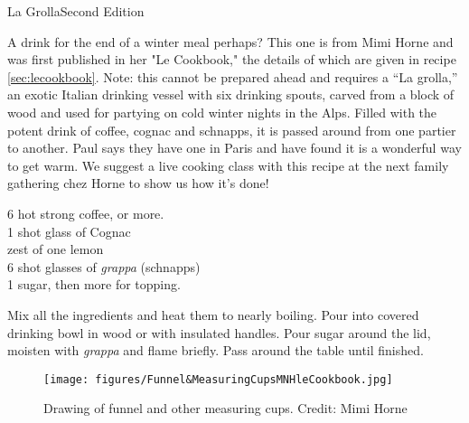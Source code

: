 \begin{entry}{La Grolla}{Second Edition}

\begin{open}
 A drink for the end of a winter meal perhaps? This one is from Mimi Horne and was first published in her "Le Cookbook," the details of which are given in recipe \ref{sec:lecookbook}. Note: this cannot be prepared ahead and requires a ``La grolla,'' an exotic Italian drinking vessel with six drinking spouts, carved from a block of wood and used for partying on cold winter nights in the Alps. Filled with the potent drink of coffee, cognac and schnapps, it is passed around from one partier to another. Paul says they have one in Paris and have found it is a wonderful way to get warm. We suggest a live cooking class with this recipe at the next family gathering chez Horne to show us how it's done!  
 
\end{open}
\begin{ingredients}
  \SI{6}{\cup} hot strong coffee, or more. \\
  1 shot glass of Cognac \\ 
  zest of one lemon \\
  6 shot glasses of \emph{grappa} (schnapps) \\ 
  \SI{1}{\cup} sugar, then more for topping. \\
 
\end{ingredients}
Mix all the ingredients and heat them to nearly boiling. Pour into covered drinking bowl in wood or with insulated handles. Pour sugar around the lid, moisten with \emph{grappa} and flame briefly. Pass around the table until finished. 

\begin{figure}
    \centering
    \texttt{[image: figures/Funnel\&MeasuringCupsMNHleCookbook.jpg]}
    \caption{Drawing of funnel and other measuring cups. Credit: Mimi Horne}
    \label{fig:mimi_funnel}
\end{figure}


\end{entry}

